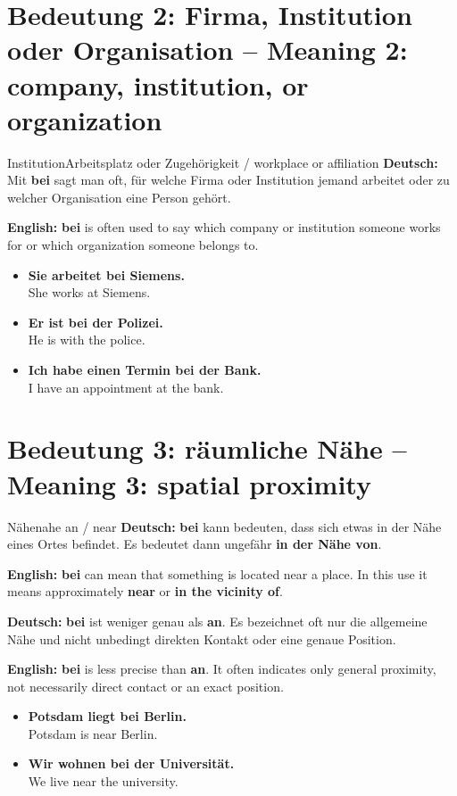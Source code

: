 \documentclass[a4paper,11pt]{article}
\newcommand{\GermanText}[1]{\textbf{Deutsch: }#1\par}
\newcommand{\EnglishText}[1]{{\small\color{SoftGray}\textbf{English: }#1\par}}
\newcommand{\ExampleItem}[2]{\item \textbf{#1}\\{\small\color{SoftGray}#2}}
\begin{document}
\section{Bedeutung 2: Firma, Institution oder Organisation -- Meaning 2: company, institution, or organization}
\begin{grammarentry}{Institution}{Arbeitsplatz oder Zugehörigkeit / workplace or affiliation}
\GermanText{Mit \textbf{bei} sagt man oft, für welche Firma oder Institution jemand arbeitet oder zu welcher Organisation eine Person gehört.}
\EnglishText{\textbf{bei} is often used to say which company or institution someone works for or which organization someone belongs to.}
\end{grammarentry}
\begin{exbox}\begin{itemize}
\ExampleItem{Sie arbeitet bei Siemens.}{She works at Siemens.}
\ExampleItem{Er ist bei der Polizei.}{He is with the police.}
\ExampleItem{Ich habe einen Termin bei der Bank.}{I have an appointment at the bank.}
\end{itemize}\end{exbox}

\section{Bedeutung 3: räumliche Nähe -- Meaning 3: spatial proximity}
\begin{grammarentry}{Nähe}{nahe an / near}
\GermanText{\textbf{bei} kann bedeuten, dass sich etwas in der Nähe eines Ortes befindet. Es bedeutet dann ungefähr \textbf{in der Nähe von}.}
\EnglishText{\textbf{bei} can mean that something is located near a place. In this use it means approximately \textbf{near} or \textbf{in the vicinity of}.}
\GermanText{\textbf{bei} ist weniger genau als \textbf{an}. Es bezeichnet oft nur die allgemeine Nähe und nicht unbedingt direkten Kontakt oder eine genaue Position.}
\EnglishText{\textbf{bei} is less precise than \textbf{an}. It often indicates only general proximity, not necessarily direct contact or an exact position.}
\end{grammarentry}
\begin{exbox}\begin{itemize}
\ExampleItem{Potsdam liegt bei Berlin.}{Potsdam is near Berlin.}
\ExampleItem{Wir wohnen bei der Universität.}{We live near the university.}
\end{itemize}\end{exbox}
\end{document}
